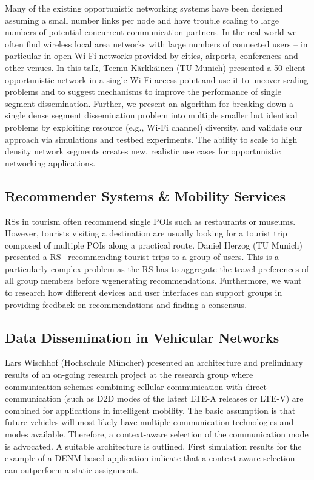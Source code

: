 Many of the existing opportunistic networking systems have been designed
assuming a small number links per node and have trouble scaling to large
numbers of potential concurrent communication partners. In the real world we
often find wireless local area networks with large numbers of connected users
– in particular in open Wi-Fi networks provided by cities, airports,
conferences and other venues. In this talk, Teemu Kärkkäinen (TU Munich)
presented a 50 client opportunistic network in a single Wi-Fi access point and
use it to uncover scaling problems and to suggest mechanisms to improve the
performance of single segment dissemination. Further, we present an algorithm
for breaking down a single dense segment dissemination problem into multiple
smaller but identical problems by exploiting resource (e.g., Wi-Fi channel)
diversity, and validate our approach via simulations and testbed experiments.
The ability to scale to high density network segments creates new, realistic
use cases for opportunistic networking applications.


\subsection{Recommender Systems \& Mobility Services}

\ac{RSs} in tourism often recommend single \ac{POIs} such as restaurants or
museums. However, tourists visiting a destination are usually looking for a
tourist trip composed of multiple \ac{POIs} along a practical route. Daniel
Herzog (TU Munich) presented a \ac{RS}~\cite{dherzog:it:2017} recommending
tourist trips to a group of users.  This is a particularly complex problem as
the \ac{RS} has to aggregate the travel preferences of all group members
before wgenerating recommendations.  Furthermore, we want to research how
different devices and user interfaces can support groups in providing feedback
on recommendations and finding a consensus.

\subsection{Data Dissemination in Vehicular Networks}

Lars Wischhof (Hochschule Müncher) presented an architecture and preliminary
results of an on-going research project at the research group where
communication schemes combining cellular communication with
direct-communication (such as \ac{D2D} modes of the latest LTE-A releases or
LTE-V) are combined for applications in intelligent mobility. The basic
assumption is that future vehicles will most-likely have multiple
communication technologies and modes available. Therefore, a context-aware
selection of the communication mode is advocated. A suitable architecture is
outlined. First simulation results for the example of a DENM-based application
indicate that a context-aware selection can outperform a static assignment.


